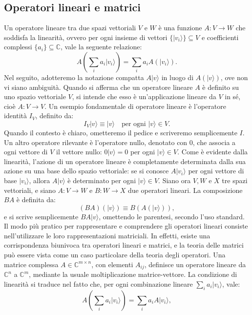 \documentclass[a4paper,12pt]{report}
\theoremstyle{plain}
\begin{document}
\subsection{Operatori lineari e matrici}
Un operatore lineare tra due spazi vettoriali \( V \) e \( W \) è una funzione \( A : V \to W \) che soddisfa la linearità, ovvero per ogni insieme di vettori \(\{|v_i\rangle\} \subseteq V\) e coefficienti complessi \(\{a_i\} \subseteq \mathbb{C}\), vale la seguente relazione:
\[A \left( \sum_i a_i |v_i\rangle \right) = \sum_i a_i A(|v_i\rangle).\]
Nel seguito, adotteremo la notazione compatta \( A|v\rangle \) in luogo di \( A(|v\rangle) \), ove non vi siano ambiguità. Quando si afferma che un operatore lineare \( A \) è definito su uno spazio vettoriale \( V \), si intende che esso è un'applicazione lineare da \( V \) in sé, cioè \( A : V \to V \).
Un esempio fondamentale di operatore lineare è l'operatore identità \( I_V \), definito da:
\[I_V |v\rangle \equiv |v\rangle \quad \text{per ogni } |v\rangle \in V.\]
Quando il contesto è chiaro, ometteremo il pedice e scriveremo semplicemente \( I \). Un altro operatore rilevante è l'operatore nullo, denotato con \( 0 \), che associa a ogni vettore di \( V \) il vettore nullo: \( 0|v\rangle = 0 \) per ogni \( |v\rangle \in V \).
Come è evidente dalla linearità, l'azione di un operatore lineare è completamente determinata dalla sua azione su una base dello spazio vettoriale: se si conosce \( A|v_i\rangle \) per ogni vettore di base \( |v_i\rangle \), allora \( A|v\rangle \) è determinato per ogni \( |v\rangle \in V \).
Siano ora \( V, W \) e \( X \) tre spazi vettoriali, e siano \( A : V \to W \) e \( B : W \to X \) due operatori lineari. La composizione \( BA \) è definita da:
\[(BA)(|v\rangle) \equiv B(A(|v\rangle)),\]
e si scrive semplicemente \( BA|v\rangle \), omettendo le parentesi, secondo l'uso standard.
Il modo più pratico per rappresentare e comprendere gli operatori lineari consiste nell'utilizzare le loro rappresentazioni matriciali. In effetti, esiste una corrispondenza biunivoca tra operatori lineari e matrici, e la teoria delle matrici può essere vista come un caso particolare della teoria degli operatori.
Una matrice complessa \( A \in \mathbb{C}^{m \times n} \), con elementi \( A_{ij} \), definisce un operatore lineare da \( \mathbb{C}^n \) a \( \mathbb{C}^m \), mediante la usuale moltiplicazione matrice-vettore. La condizione di linearità si traduce nel fatto che, per ogni combinazione lineare \( \sum_i a_i |v_i\rangle \), vale:
\[A \left( \sum_i a_i |v_i\rangle \right) = \sum_i a_i A |v_i\rangle,\]
\end{document}
